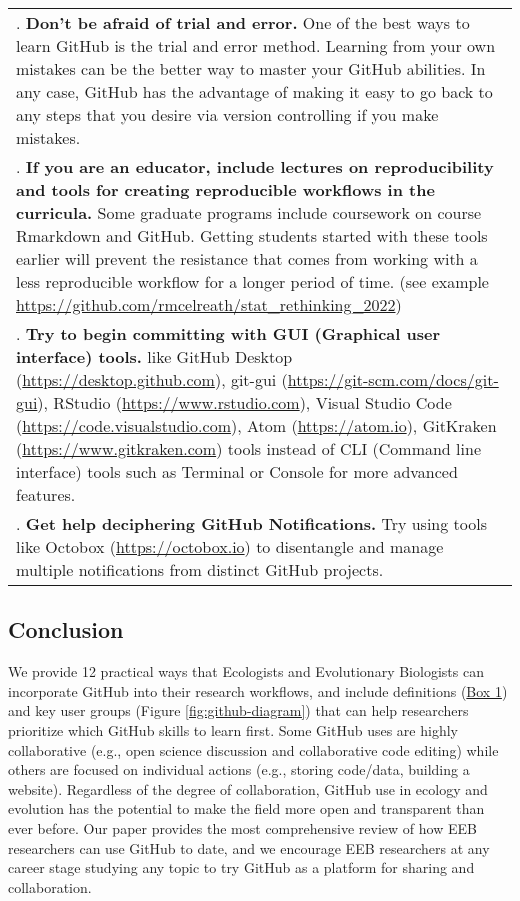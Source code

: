 \begin{tablenos:no-prefix-table-caption}
\begin{longtable}[]{@{}
  >{\raggedright\arraybackslash}p{}@{}}
7. \textbf{Don't be afraid of trial and error.} One of the best ways to learn GitHub is the trial and error method. Learning from your own mistakes can be the better way to master your GitHub abilities. In any case, GitHub has the advantage of making it easy to go back to any steps that you desire via version controlling if you make mistakes. \\
8. \textbf{If you are an educator, include lectures on reproducibility and tools for creating reproducible workflows in the curricula.} Some graduate programs include coursework on course Rmarkdown and GitHub. Getting students started with these tools earlier will prevent the resistance that comes from working with a less reproducible workflow for a longer period of time. (see example \url{https://github.com/rmcelreath/stat_rethinking_2022}) \\
9. \textbf{Try to begin committing with GUI (Graphical user interface) tools.} like GitHub Desktop (\url{https://desktop.github.com}), git-gui (\url{https://git-scm.com/docs/git-gui}), RStudio (\url{https://www.rstudio.com}), Visual Studio Code (\url{https://code.visualstudio.com}), Atom (\url{https://atom.io}), GitKraken (\url{https://www.gitkraken.com}) tools instead of CLI (Command line interface) tools such as Terminal or Console for more advanced features. \\
10. \textbf{Get help deciphering GitHub Notifications.} Try using tools like Octobox (\url{https://octobox.io}) to disentangle and manage multiple notifications from distinct GitHub projects. \\
\bottomrule
\end{longtable}

\end{tablenos:no-prefix-table-caption}

\hypertarget{conclusion}{%
\subsection{Conclusion}\label{conclusion}}

We provide 12 practical ways that Ecologists and Evolutionary Biologists can incorporate GitHub into their research workflows, and include definitions (\protect\hyperlink{definitions}{Box 1}) and key user groups (Figure \ref{fig:github-diagram}) that can help researchers prioritize which GitHub skills to learn first.
Some GitHub uses are highly collaborative (e.g., open science discussion and collaborative code editing) while others are focused on individual actions (e.g., storing code/data, building a website).
Regardless of the degree of collaboration, GitHub use in ecology and evolution has the potential to make the field more open and transparent than ever before.
Our paper provides the most comprehensive review of how EEB researchers can use GitHub to date, and we encourage EEB researchers at any career stage studying any topic to try GitHub as a platform for sharing and collaboration.


